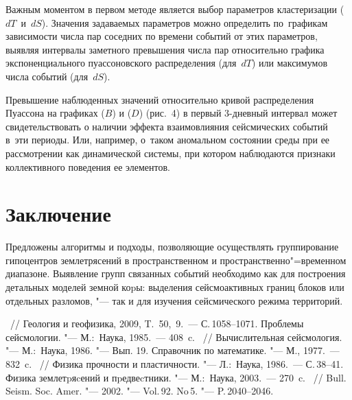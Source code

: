 \documentclass[twoside]{article}
\begin{document}
Важным моментом в первом методе является выбор параметров кластеризации ($dT$~и~$dS$).
Значения задаваемых параметров можно определить по~графикам зависимости числа пар
соседних по времени событий от этих параметров, выявляя интервалы заметного превышения
числа пар относительно графика экспоненциального пуассоновского распределения
(для~$dT$) или максимумов числа событий (для~$dS$).

\balance
Превышение наблюденных значений относительно кривой распределения Пуассона
на графиках ($B$) и ($D$) (рис.~4) в первый 3-дневный интервал может
свидетельствовать о наличии эффекта взаимовлияния сейсмических
событий \cite{authors07} в~эти периоды. Или, например, о~таком аномальном
состоянии среды при ее рассмотрении как динамической системы, при котором
наблюдаются признаки коллективного поведения ее элементов.



\section{Заключение}
Предложены алгоритмы и подходы, по\-зво\-ля\-ющие осуществлять  группирование
гипо\-центров землетрясений в пространственном и пространственно"=временном диапазоне.
Выявление групп связанных событий необходимо как для построения детальных моделей земной
коpы: выделения сейс\-мо\-ак\-тив\-ных границ блоков или отдельных разломов, "---
так и для изучения сейсмического режима территорий.

\medskip
\begin{thebibliography}{1}
\smallskip
{}
    ~//
    Геология и геофизика,
    2009, T.~50, \No\,9.~--- С.\,1058--1071.
    Проблемы сейсмологии. "---
    М.:~Наука, 1985.~--- 408~c.
    ~//
    Вычислительная сейсмология. "---
    М.:~Наука, 1986. "--- Вып. 19.
    Справочник по математике. %
    "--- М., 1977.~--- 832~c.
    ~//
    Физика прочности и пластичности. "---
    Л.:~Наука, 1986.~--- С.\,38--41.
    Физика землетpяcений и пpедвеcтники. "---
    М.:~Наука, 2003.~--- 270~c.
    ~//
    Bull. Seism. Soc. Amer. "--- 2002. "--- Vol.\,92. No\,5. "--- P.\,2040--2046.
\end{thebibliography}

\end{document}

